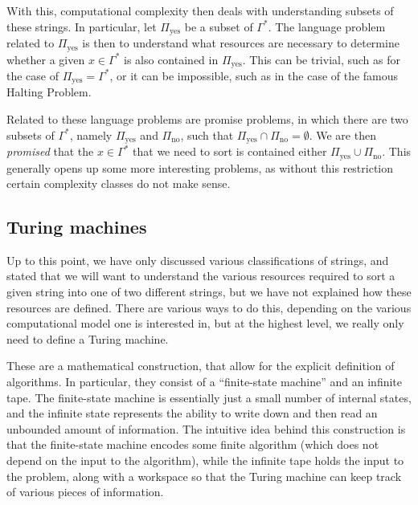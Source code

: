 \documentclass[../thesis-main/thesis-main]{subfiles}
\begin{document}
With this, computational complexity then deals with understanding subsets of these strings.  In particular, let $\Pi_{\text{yes}}$ be a subset of $\Gamma^*$.  The language problem related to $\Pi_{\text{yes}}$ is then to understand what resources are necessary to determine whether a given $x\in \Gamma^*$ is also contained in $\Pi_{\text{yes}}$.  This can be trivial, such as for the case of $\Pi_{\text{yes}} = \Gamma^*$, or it can be impossible, such as in the case of the famous Halting Problem.


Related to these language problems are promise problems, in which there are two subsets of $\Gamma^*$, namely $\Pi_{\text{yes}}$ and $\Pi_{\text{no}}$, such that $\Pi_{\text{yes}} \cap \Pi_{\text{no}} = \emptyset$.  We are then \emph{promised} that the $x\in \Gamma^*$ that we need to sort is contained either $\Pi_{\text{yes}} \cup \Pi_{\text{no}}$.  This generally opens up some more interesting problems, as without this restriction certain complexity classes do not make sense.

\subsection{Turing machines}

Up to this point, we have only discussed various classifications of strings, and stated that we will want to understand the various resources required to sort a given string into one of two different strings, but we have not explained how these resources are defined.  There are various ways to do this, depending on the various computational model one is interested in, but at the highest level, we really only need to define a Turing machine.

These are a mathematical construction, that allow for the explicit definition of algorithms.  In particular, they consist of a ``finite-state machine'' and an infinite tape.  The finite-state machine is essentially just a small number of internal states, and the infinite state represents the ability to write down and then read an unbounded amount of information.  The intuitive idea behind this construction is that the finite-state machine encodes some finite algorithm (which does not depend on the input to the algorithm), while the infinite tape holds the input to the problem, along with a workspace so that the Turing machine can keep track of various pieces of information.
\end{document}
